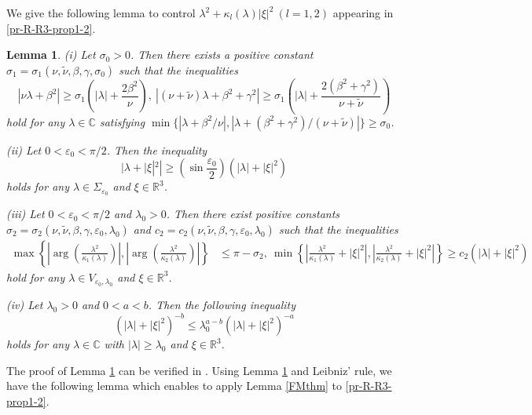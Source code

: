 \documentclass[dvipdfmx,12pt]{article}
\newtheorem{lem}[dfn]{Lemma}
\begin{document}
We give the following lemma to control $\lambda^2+\kappa_l(\lambda)|\xi|^2~(l=1,2)$ appearing in \eqref{pr-R-R3-prop1-2}.
\begin{lem}\label{R-R3-lem1}
{\rm (i)} Let $\sigma_0>0$. Then there exists a positive constant $\sigma_1=\sigma_1(\nu,\tilde{\nu},\beta,\gamma,\sigma_0)$ such that the inequalities
\[
|\nu\lambda+\beta^2|\ge \sigma_1\left(|\lambda|+\frac{2\beta^2}{\nu}\right),~|(\nu+\tilde{\nu})\lambda+\beta^2+\gamma^2|\ge \sigma_1\left(|\lambda|+\frac{2(\beta^2+\gamma^2)}{\nu+\tilde{\nu}}\right)
\]
hold for any $\lambda\in\mathbb{C}$ satisfying $\min\{|\lambda+\beta^2/\nu|,|\lambda+(\beta^2+\gamma^2)/(\nu+\tilde{\nu})|\}\ge\sigma_0$.

\noindent
{\rm (ii)} Let $0<\varepsilon_0<\pi/2$. Then the inequality
\[
|\lambda+|\xi|^2|\ge \left(\sin\frac{\varepsilon_0}{2}\right)(|\lambda|+|\xi|^2)
\]
holds for any $\lambda\in \Sigma_{\varepsilon_0}$ and $\xi\in\mathbb{R}^3$.


\noindent
{\rm (iii)} Let $0<\varepsilon_0<\pi/2$ and $\lambda_0>0$. Then there exist positive constants $\sigma_2=\sigma_2(\nu,\tilde{\nu},\beta,\gamma,\varepsilon_0,\lambda_0)$ and $c_2=c_2(\nu,\tilde{\nu},\beta,\gamma,\varepsilon_0,\lambda_0)$ such that the inequalities
\begin{align*}
\max\left\{ \left| \arg\left( \frac{\lambda^2}{\kappa_1(\lambda)} \right) \right|, \left| \arg\left( \frac{\lambda^2}{\kappa_2(\lambda)} \right)  \right|  \right\} &\le \pi -\sigma_2,~
\min\left\{ \left|  \frac{\lambda^2}{\kappa_1(\lambda)} +|\xi|^2\right|, \left| \frac{\lambda^2}{\kappa_2(\lambda)} +|\xi|^2 \right| \right\}\ge c_2(|\lambda|+|\xi|^2)
\end{align*}
hold for any $\lambda\in V_{\varepsilon_0,\lambda_0}$ and $\xi\in\mathbb{R}^3$.


\noindent
{\rm (iv)}
Let $\lambda_0>0$ and $0<a<b$. Then the following inequality 
\[
(|\lambda|+|\xi|^2)^{-b}\le \lambda_0^{a-b}(|\lambda|+|\xi|^2)^{-a}
\]
holds for any $\lambda\in\mathbb{C}$ with $|\lambda|\ge\lambda_0$ and $\xi\in\mathbb{R}^3$.
\end{lem}
The proof of Lemma \ref{R-R3-lem1} can be verified in \cite{SE18, ShTa04}. Using Lemma \ref{R-R3-lem1} and Leibniz' rule, we have the following lemma which enables to apply Lemma \ref{FMthm} to \eqref{pr-R-R3-prop1-2}.
\end{document}
